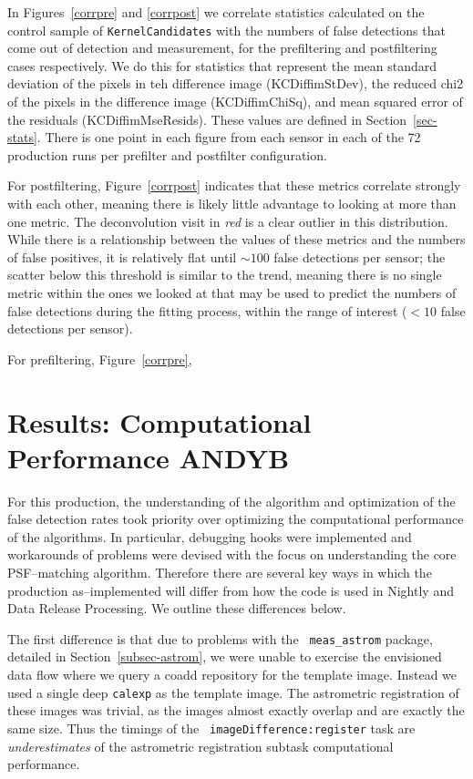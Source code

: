 \documentclass[prd, nofootinbib, floatfix, 11pt,tightenlines,times]{article}
\begin{document}
In Figures~\ref{corrpre} and \ref{corrpost} we correlate statistics
calculated on the control sample of {\tt KernelCandidates} with the
numbers of false detections that come out of detection and
measurement, for the prefiltering and postfiltering cases
respectively.  We do this for statistics that represent the mean
standard deviation of the pixels in teh difference image
(KCDiffimStDev), the reduced chi2 of the pixels in the difference
image (KCDiffimChiSq), and mean squared error of the residuals
(KCDiffimMseResids).  These values are defined in
Section~\ref{sec-stats}.  There is one point in each figure from each
sensor in each of the 72 production runs per prefilter and postfilter
configuration.

For postfiltering, Figure~\ref{corrpost} indicates that these metrics
correlate strongly with each other, meaning there is likely little
advantage to looking at more than one metric.  The deconvolution visit
in {\it red} is a clear outlier in this distribution.  While there is
a relationship between the values of these metrics and the numbers of
false positives, it is relatively flat until $\sim 100$ false
detections per sensor; the scatter below this threshold is similar to
the trend, meaning there is no single metric within the ones we looked
at that may be used to predict the numbers of false detections during
the fitting process, within the range of interest ($<10$ false
detections per sensor).

For prefiltering, Figure~\ref{corrpre}, 



\section{Results: Computational Performance {\bf ANDYB}}

For this production, the understanding of the algorithm and
optimization of the false detection rates took priority over
optimizing the computational performance of the algorithms.  In
particular, debugging hooks were implemented and workarounds of
problems were devised with the focus on understanding the core
PSF--matching algorithm.  Therefore there are several key ways in
which the production as--implemented will differ from how the code is
used in Nightly and Data Release Processing.  We outline these
differences below.

The first difference is that due to problems with the {\tt
  meas\_astrom} package, detailed in Section~\ref{subsec-astrom}, we
were unable to exercise the envisioned data flow where we query a
coadd repository for the template image.  Instead we used a single
deep {\tt calexp} as the template image.  The astrometric registration
of these images was trivial, as the images almost exactly overlap and
are exactly the same size.  Thus the timings of the {\tt
  imageDifference:register} task are {\it underestimates} of the
astrometric registration subtask computational performance.
\end{document}
